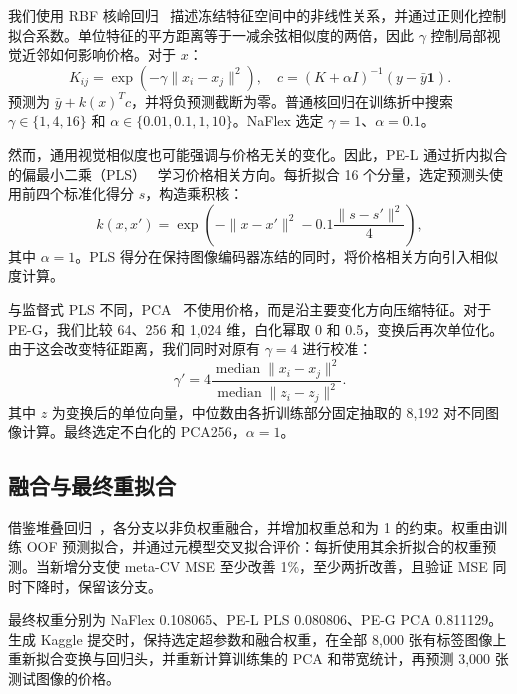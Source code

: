 \documentclass[conference,a4paper]{IEEEtran}
\begin{document}
我们使用 RBF 核岭回归~\cite{krr} 描述冻结特征空间中的非线性关系，并通过正则化控制拟合系数。单位特征的平方距离等于一减余弦相似度的两倍，因此 $\gamma$ 控制局部视觉近邻如何影响价格。对于 $x$：
\begin{equation}
 K_{ij}=\exp(-\gamma\|x_i-x_j\|^2),\quad
 c=(K+\alpha I)^{-1}(y-\bar y\mathbf{1}).
\end{equation}
预测为 $\bar y+k(x)^Tc$，并将负预测截断为零。普通核回归在训练折中搜索 $\gamma\in\{1,4,16\}$ 和 $\alpha\in\{0.01,0.1,1,10\}$。NaFlex 选定 $\gamma=1$、$\alpha=0.1$。

然而，通用视觉相似度也可能强调与价格无关的变化。因此，PE-L 通过折内拟合的偏最小二乘（PLS）~\cite{pls1966,pls} 学习价格相关方向。每折拟合 16 个分量，选定预测头使用前四个标准化得分 $s$，构造乘积核：
\begin{equation}
 k(x,x')=\exp\left(-\|x-x'\|^2-0.1\frac{\|s-s'\|^2}{4}\right),
\end{equation}
其中 $\alpha=1$。PLS 得分在保持图像编码器冻结的同时，将价格相关方向引入相似度计算。

与监督式 PLS 不同，PCA~\cite{pca} 不使用价格，而是沿主要变化方向压缩特征。对于 PE-G，我们比较 64、256 和 1,024 维，白化幂取 0 和 0.5，变换后再次单位化。由于这会改变特征距离，我们同时对原有 $\gamma=4$ 进行校准：
\begin{equation}
 \gamma'=4\frac{\operatorname{median}\|x_i-x_j\|^2}
 {\operatorname{median}\|z_i-z_j\|^2}.
\end{equation}
其中 $z$ 为变换后的单位向量，中位数由各折训练部分固定抽取的 8,192 对不同图像计算。最终选定不白化的 PCA256，$\alpha=1$。

\subsection{融合与最终重拟合}
借鉴堆叠回归~\cite{stacking}，各分支以非负权重融合，并增加权重总和为 1 的约束。权重由训练 OOF 预测拟合，并通过元模型交叉拟合评价：每折使用其余折拟合的权重预测。当新增分支使 meta-CV MSE 至少改善 1\%，至少两折改善，且验证 MSE 同时下降时，保留该分支。

最终权重分别为 NaFlex 0.108065、PE-L PLS 0.080806、PE-G PCA 0.811129。生成 Kaggle 提交时，保持选定超参数和融合权重，在全部 8,000 张有标签图像上重新拟合变换与回归头，并重新计算训练集的 PCA 和带宽统计，再预测 3,000 张测试图像的价格。
\end{document}
